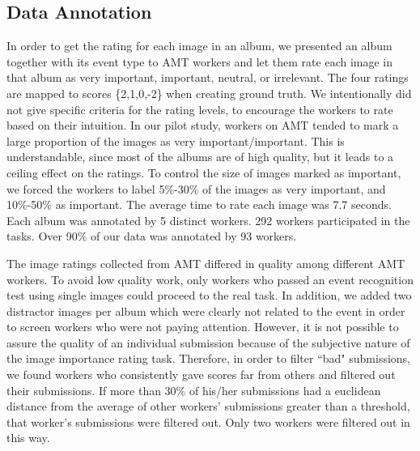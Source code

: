 \documentclass[10pt,twocolumn,letterpaper]{article}
\begin{document}
\subsection{Data Annotation}

In order to get the rating for each image in an album, we presented an album together with its event type to AMT workers and let them rate each image in that album as very important, important, neutral, or irrelevant. The four ratings are mapped to scores \{2,1,0,-2\} when creating ground truth. We intentionally did not give specific criteria for the rating levels, to encourage the workers to rate based on their intuition. In our pilot study, workers on AMT tended to mark a large proportion of the images as very important/important. This is understandable, since most of the albums are of high quality, but it leads to a ceiling effect on the ratings. To control the size of images marked as important, we forced the workers to label 5\%-30\% of the images as very important, and 10\%-50\% as important. The average time to rate each image was 7.7 seconds. Each album was annotated by 5 distinct workers. 292 workers participated in the tasks. Over 90\% of our data was annotated by 93 workers. 

The image ratings collected from AMT differed in quality among different AMT workers. To avoid low quality work,  only workers who passed an event recognition test using  single images could proceed to the real task. In addition, we added two distractor images per album which were clearly not related to the event in order to screen workers who were not paying attention. However, it  is not possible to assure the quality of an individual submission because of the subjective nature of the image importance rating task. Therefore, in order to filter ``bad" submissions, we found workers who consistently gave scores far from others and filtered out their submissions. If more than 30\% of his/her submissions had a euclidean distance from the average of other workers' submissions greater than a threshold, that worker's submissions were filtered out.  Only two workers were filtered out in this way.

\end{document}
